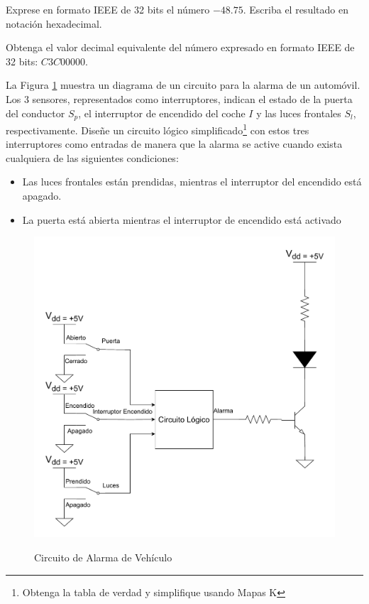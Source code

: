 \documentclass[addpoints]{exam}
\begin{document}
\begin{questions}
\clearpage

 \question[2] Exprese en formato IEEE de 32 bits el número
$-48.75$. Escriba el resultado en notación hexadecimal. %



\question[2] Obtenga el valor decimal equivalente del número expresado en
formato  IEEE de 32 bits: $C3C00000$. %



\question[2] La Figura \ref{fig:circuito} muestra un diagrama de un
circuito para la alarma de un automóvil. Los 3 sensores, representados
como interruptores, indican el estado de la puerta del conductor
$S_p$, el interruptor de encendido del coche $I$ y las luces frontales
$S_l$, respectivamente. Diseñe un circuito lógico
simplificado\footnote{Obtenga la tabla de verdad y simplifique usando
  Mapas K} con estos tres interruptores como
entradas de manera que la alarma se active cuando exista cualquiera de
las siguientes condiciones:

\begin{itemize}
  \item Las luces frontales están prendidas, mientras el interruptor del
  encendido está apagado.
\item La puerta está abierta mientras el interruptor de encendido está
  activado
\end{itemize}


\begin{figure}[h!]
  \centering
  \caption{Circuito de Alarma de Vehículo}
  \includegraphics[scale=0.6]{./images/Problema4-8.pdf}
  \label{fig:circuito}
\end{figure}


\end{questions}

\begin{center}
  \scriptsize
  \combinedgradetable[h][questions]
\end{center}
\end{document}

